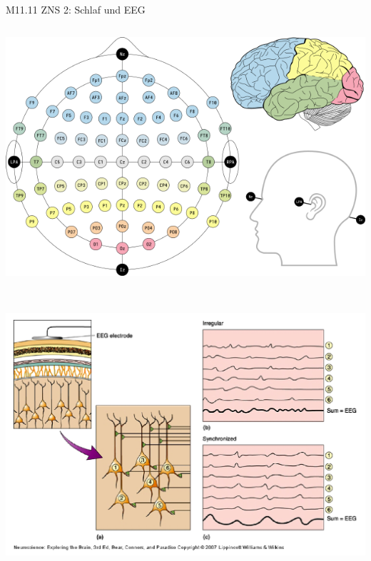 \documentclass{beamer}
\begin{document}


\section{}


\begin{frame}{M11.11 ZNS 2: Schlaf und EEG} 

\begin{columns}[c]

\begin{column}{5cm}

\begin{center}
    
    \includegraphics[width=\textwidth]{EEG_10-10_system.png}
    
    
    \end{center}
    
    $\,$\\
    
    \begin{center}
        \includegraphics[width=\textwidth]{EEG_synchrony..png}


\end{center}
\end{column}
\end{columns}
\end{frame}
\end{document}
